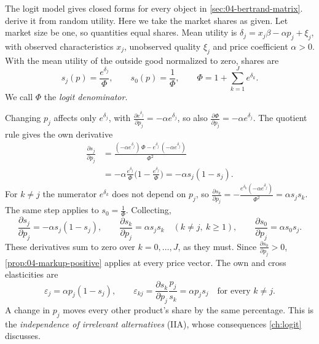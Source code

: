 The logit model gives closed forms for every object in \cref{sec:04-bertrand-matrix}. 
derive it from random utility. Here we take the market shares as given. Let market size be one, so quantities
equal shares. Mean utility is $\delta_j = x_j\beta - \alpha p_j + \xi_j$, with observed characteristics $x_j$,
unobserved quality $\xi_j$ and price coefficient $\alpha > 0$. With the mean utility of the outside good
normalized to zero, shares are
\begin{equation*}
s_j(p) = \frac{e^{\delta_j}}{\Phi},
\qquad
s_0(p) = \frac{1}{\Phi},
\qquad
\Phi = 1 + \sum_{k = 1}^{J}e^{\delta_k}.
\end{equation*}
We call $\Phi$ the \emph{logit denominator}.

Changing $p_j$ affects only $e^{\delta_j}$, with $\frac{\partial e^{\delta_j}}{\partial p_j} = -\alpha e^{\delta_j}$,
so also $\frac{\partial\Phi}{\partial p_j} = -\alpha e^{\delta_j}$. The quotient rule gives the own derivative
\begin{align*}
\frac{\partial s_j}{\partial p_j}
&= \frac{(-\alpha e^{\delta_j})\,\Phi - e^{\delta_j}\,(-\alpha e^{\delta_j})}{\Phi^2} \\
&= -\alpha\frac{e^{\delta_j}}{\Phi}\Big(1 - \frac{e^{\delta_j}}{\Phi}\Big)
= -\alpha s_j(1 - s_j).
\end{align*}
For $k \ne j$ the numerator $e^{\delta_k}$ does not depend on $p_j$, so
$\frac{\partial s_k}{\partial p_j} = -\frac{e^{\delta_k}(-\alpha e^{\delta_j})}{\Phi^2} = \alpha s_js_k$. The same
step applies to $s_0 = \frac{1}{\Phi}$. Collecting,
\begin{equation}\label{eq:04-logit-derivs}
\frac{\partial s_j}{\partial p_j} = -\alpha s_j(1 - s_j),
\qquad
\frac{\partial s_k}{\partial p_j} = \alpha s_js_k \quad (k \ne j,\ k \ge 1),
\qquad
\frac{\partial s_0}{\partial p_j} = \alpha s_0s_j.
\end{equation}
These derivatives sum to zero over $k = 0, \dots, J$, as they must. Since $\frac{\partial s_0}{\partial p_j} > 0$,
\cref{prop:04-markup-positive} applies at every price vector. The own and cross elasticities are
\begin{equation*}
\varepsilon_j = \alpha p_j(1 - s_j),
\qquad
\varepsilon_{kj} = \frac{\partial s_k}{\partial p_j}\frac{p_j}{s_k} = \alpha p_js_j \quad \text{for every } k \ne j.
\end{equation*}
A change in $p_j$ moves every other product's share by the same percentage. This is the \emph{independence of
irrelevant alternatives} (IIA), whose consequences \cref{ch:logit} discusses.

